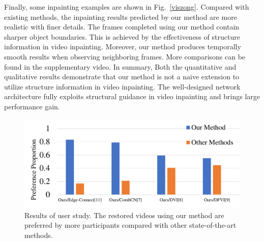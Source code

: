 Finally, some inpainting examples are shown in Fig.~\ref{viszong}.
Compared with existing methods, the inpainting results predicted by our method are more realistic with finer details. 
The frames completed using our method contain sharper object boundaries. This is achieved by the effectiveness of structure information in video inpainting.
Moreover, our method produces temporally smooth results when observing neighboring frames. More comparisons can be found in the supplementary video. 
In summary, Both the quantitative and qualitative results demonstrate that our method is not a naive extension to utilize structure information in video inpainting.
The well-designed network architecture fully exploits structural guidance in video inpainting and brings large performance gain.





\begin{figure}[!t]
	\centering
	\includegraphics[width=1.0\columnwidth]{userstudy} %
	\caption{Results of user study. The restored videos using our method are preferred by more participants compared with other state-of-the-art methods. }
	\label{userstudy}
\end{figure}






